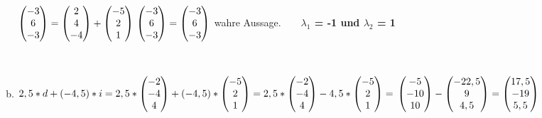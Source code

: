 \documentclass[10pt,ngerman]{scrartcl}
\begin{document}
\begin{enumerate}[1.]
\begin{enumerate}[(a)]
\begin{math}
	\begin{pmatrix}-3 \\ 6 \\ -3\end{pmatrix} = \begin{pmatrix}2 \\ 4 \\ -4\end{pmatrix} + \begin{pmatrix}-5 \\ 2 \\ 1\end{pmatrix} \newline
		\begin{pmatrix}-3 \\ 6 \\ -3\end{pmatrix} = \begin{pmatrix}-3 \\ 6 \\ -3\end{pmatrix}\end{math} wahre Aussage. \newline 
		~\newline
		~\newline
	\textbf{$\lambda _ 1$ = -1 und $\lambda _ 2$ = 1}
	
	~\newline~
	
		\item \begin{math}2,5 * d + (-4,5) * i = 2,5 * \begin{pmatrix}-2 \\ -4 \\ 4\end{pmatrix} + (-4,5) * \begin{pmatrix}-5 \\ 2 \\ 1\end{pmatrix} = 2,5 * \begin{pmatrix}-2 \\ -4 \\ 4\end{pmatrix} -4,5 * \begin{pmatrix}-5 \\ 2 \\ 1\end{pmatrix} = \newline
		\begin{pmatrix}-5 \\ -10 \\ 10\end{pmatrix} - \begin{pmatrix}-22,5 \\ 9 \\ 4,5\end{pmatrix} = \begin{pmatrix}17,5 \\ -19 \\ 5,5\end{pmatrix}	\end{math}
	\end{enumerate}
	

\end{enumerate}
\end{document}
